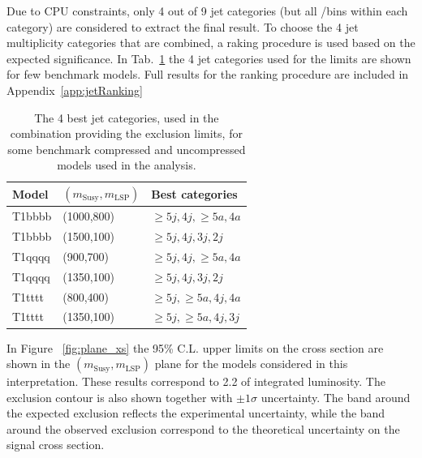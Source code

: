 Due to CPU constraints, only 4 out of 9 jet categories (but all \nb/\scalht bins
within each category) are considered to extract the final result. 
To choose the 4 jet multiplicity categories that are combined, a raking procedure 
is used based on the expected significance. 
In Tab.~\ref{tab:sig-bestCats} the 4 jet categories used for the limits are shown for few benchmark models. 
Full results for the ranking procedure are included in Appendix~\ref{app:jetRanking}

\begin{table}[h!]
  \caption{
    The 4 best jet categories, used in the combination providing the exclusion limits, 
    for some benchmark compressed and uncompressed models used in the analysis.
  }
  \label{tab:sig-bestCats}
  \centering
  \begin{tabular}{ lll }
    \hline
    \hline
    Model & $(m_{\mathrm{Susy}},m_{\mathrm{LSP}})$ & Best categories \\ 
    \hline
    T1bbbb & (1000,800) & $\geq5j,4j,\geq5a,4a$ \\
    T1bbbb & (1500,100) & $\geq5j,4j,3j,2j$ \\
    T1qqqq & (900,700)  & $\geq5j,4j,\geq5a,4a$ \\
    T1qqqq & (1350,100)  & $\geq5j,4j,3j,2j$ \\
    T1tttt & (800,400) & $\geq5j,\geq5a,4j,4a$ \\
    T1tttt & (1350,100) & $\geq5j,\geq5a,4j,3j$ \\
    \hline
    \hline
  \end{tabular}
\end{table}

In Figure ~\ref{fig:plane_xs} the 95\% C.L. upper limits on the cross section are shown 
in the $(m_{\mathrm{Susy}},m_{\mathrm{LSP}})$ plane for the models considered in this interpretation. 
These results correspond to 2.2 \ifb of integrated luminosity. 
The exclusion contour is also shown together with $\pm1\sigma$ uncertainty. 
The band around the expected exclusion reflects the experimental uncertainty, 
while the band around the observed exclusion correspond to the theoretical 
uncertainty on the signal cross section.

